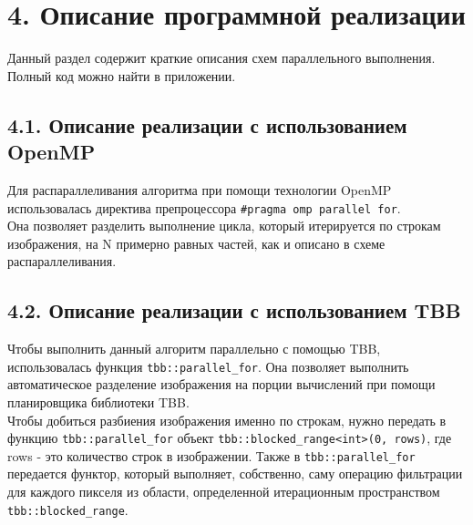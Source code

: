 \documentclass{report}
\begin{document}
    \newpage
    \section*{4. Описание программной реализации}
    \par Данный раздел содержит краткие описания схем параллельного выполнения. Полный код можно найти в приложении.
    \subsection*{4.1. Описание реализации с использованием OpenMP}
    \par Для распараллеливания алгоритма при помощи технологии OpenMP использовалась директива препроцессора \verb|#pragma omp parallel for|. \\
    Она позволяет разделить выполнение цикла, который итерируется по строкам изображения, на N примерно равных частей, как и описано в схеме распараллеливания.
    \subsection*{4.2. Описание реализации с использованием TBB}
    \par Чтобы выполнить данный алгоритм параллельно с помощью TBB, использовалась функция \verb|tbb::parallel_for|. Она позволяет выполнить автоматическое разделение изображения на порции вычислений при помощи планировщика библиотеки TBB. \\
    Чтобы добиться разбиения изображения именно по строкам, нужно передать в функцию \verb|tbb::parallel_for| объект \verb|tbb::blocked_range<int>(0, rows)|, где rows - это количество строк в изображении. Также в \verb|tbb::parallel_for| передается функтор, который выполняет, собственно, саму операцию фильтрации для каждого пикселя из области, определенной итерационным пространством \verb|tbb::blocked_range|.
\end{document}
